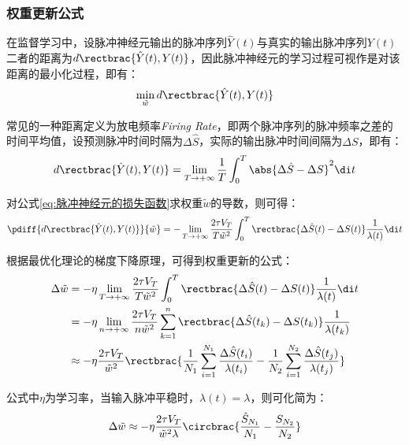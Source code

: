 \documentclass[11pt]{article}
\begin{document}
\subsubsection{权重更新公式}
在监督学习中，设脉冲神经元输出的脉冲序列$\hat{Y}(t)$与真实的输出脉冲序列$Y(t)$二者的距离为$d\rectbrac{\hat{Y}(t),Y(t)}$，因此脉冲神经元的学习过程可视作是对该距离的最小化过程，即有：
\begin{align*}
  \min_{\tilde{w}}d\rectbrac{\hat{Y}(t),Y(t)}
\end{align*}\par
常见的一种距离定义为放电频率\textit{Firing Rate}，即两个脉冲序列的脉冲频率之差的时间平均值，设预测脉冲时间时隔为$\Delta\hat{S}$，实际的输出脉冲时间间隔为$\Delta S$，即有：
\begin{align}
  d\rectbrac{\hat{Y}(t),Y(t)}=\lim_{T\to+\infty}\frac{1}{T}\int_{0}^{T}\abs{\Delta\hat{S}-\Delta S}^2\di t
  \label{eq:脉冲神经元的损失函数}
\end{align}\par
对公式\ref{eq:脉冲神经元的损失函数}求权重$\tilde{w}$的导数，则可得：
\begin{align}
  \pdiff{d\rectbrac{\hat{Y}(t),Y(t)}}{\tilde{w}}=-\lim_{T\to+\infty}\frac{2\tau V_T}{T\tilde{w}^2}\int_{0}^{T}\rectbrac{\Delta\hat{S}(t)-\Delta S(t)}\frac{1}{\lambda(t)}\di t
\end{align}\par
根据最优化理论的梯度下降原理，可得到权重更新的公式：
\begin{align*}
  \begin{aligned}
    \Delta\tilde{w} & =-\eta\lim_{T\to+\infty}\frac{2\tau V_T}{T\tilde{w}^2}\int_{0}^{T}\rectbrac{\Delta\hat{S}(t)-\Delta S(t)}\frac{1}{\lambda(t)}\di t                                                            \\
                    & =-\eta\lim_{n\to+\infty}\frac{2\tau V_T}{n\tilde{w}^2}\sum_{k=1}^{n}\rectbrac{\Delta\hat{S}(t_k)-\Delta S(t_k)}\frac{1}{\lambda(t_k)}                                                         \\
                    & \approx-\eta\frac{2\tau V_T}{\tilde{w}^2}\rectbrac{\frac{1}{N_1}\sum_{i=1}^{N_1}\frac{\Delta\hat{S}(t_i)}{\lambda(t_i)}-\frac{1}{N_2}\sum_{i=1}^{N_2}\frac{\Delta\hat{S}(t_j)}{\lambda(t_j)}}
  \end{aligned}
\end{align*}\par
公式中$\eta$为学习率，当输入脉冲平稳时，$\lambda(t)=\lambda$，则可化简为：
\begin{align}
  \begin{aligned}
    \Delta\tilde{w}\approx-\eta\frac{2\tau V_T}{\tilde{w}^2\lambda}\circbrac{\frac{\hat{S}_{N_1}}{N_1}-\frac{S_{N_2}}{N_2}}
  \end{aligned}
  \label{eq:脉冲神经元权重更新公式}
\end{align}\par
\end{document}
